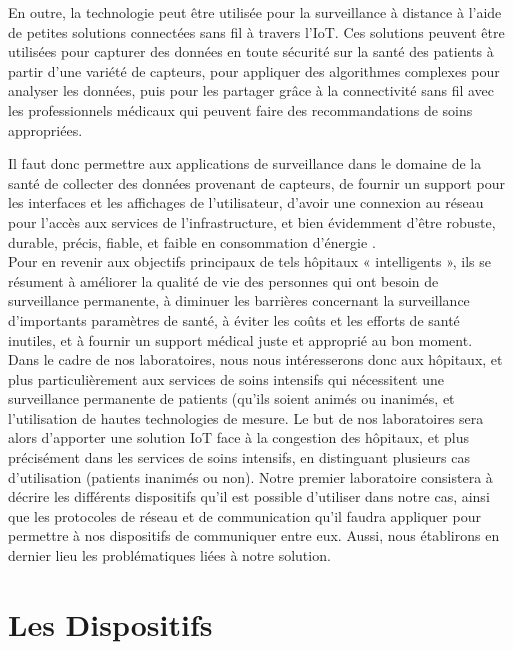 \documentclass{article}
\begin{document}
En outre, la technologie peut être utilisée pour la surveillance à distance à l'aide de petites solutions connectées sans fil à travers l'IoT. Ces solutions peuvent être utilisées pour capturer des données en toute sécurité sur la santé des patients à partir d'une variété de capteurs, pour appliquer des algorithmes complexes pour analyser les données, puis pour les partager grâce à la connectivité sans fil avec les professionnels médicaux qui peuvent faire des recommandations de soins appropriées.

Il faut donc permettre aux applications de surveillance dans le domaine de la santé de collecter des données provenant de capteurs, de fournir un support pour les interfaces et les affichages de l’utilisateur, d’avoir une connexion au réseau pour l’accès aux services de l’infrastructure, et bien évidemment d’être robuste, durable, précis, fiable, et faible en consommation d’énergie \cite{vermesan2014internet}.
\\

Pour en revenir aux objectifs principaux de tels hôpitaux « intelligents », ils se résument à améliorer la qualité de vie des personnes qui ont besoin de surveillance permanente, à diminuer les barrières concernant la surveillance d’importants paramètres de santé, à éviter les coûts et les efforts de santé inutiles, et à fournir un support médical juste et approprié au bon moment.
\\

Dans le cadre de nos laboratoires, nous nous intéresserons donc aux hôpitaux, et plus particulièrement aux services de soins intensifs qui nécessitent une surveillance permanente de patients (qu’ils soient animés ou inanimés, et l’utilisation de hautes technologies de mesure. Le but de nos laboratoires sera alors d’apporter une solution IoT face à la congestion des hôpitaux, et plus précisément dans les services de soins intensifs, en distinguant plusieurs cas d’utilisation (patients inanimés ou non). Notre premier laboratoire consistera à décrire les différents dispositifs qu’il est possible d’utiliser dans notre cas, ainsi que les protocoles de réseau et de communication qu’il faudra appliquer pour permettre à nos dispositifs de communiquer entre eux. Aussi, nous établirons en dernier lieu les problématiques liées à notre solution. 

\section{Les Dispositifs}
\end{document}
